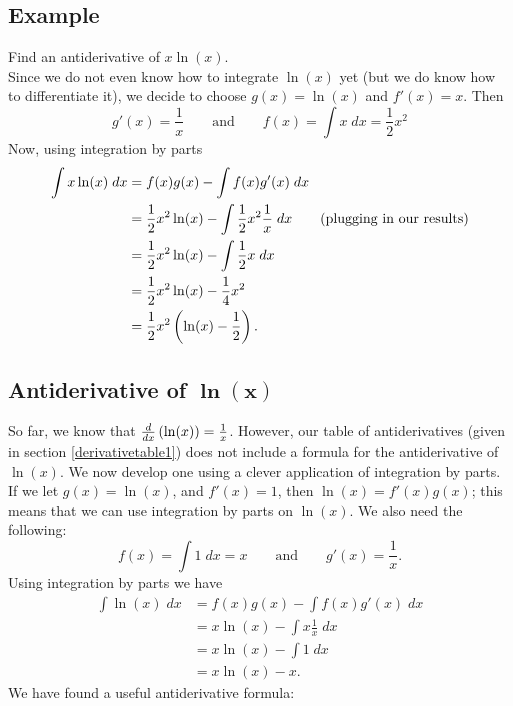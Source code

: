 \subsection{Example}
Find an antiderivative of $x\ln(x)$. \\

\solution
Since we do not even know how to integrate $\ln(x)$ yet (but we do know how to differentiate it), we decide to choose $g(x) = \ln(x)$ and $f'(x) = x$. Then
\[
g'(x) = \frac{1}{x} \qquad \text{and} \qquad f(x) = \int x \; dx = \frac{1}{2}x^2 
\]
Now, using integration by parts
\begin{align*}
\int x\ln(x) \; dx & = f(x)g(x) - \int f(x)g'(x) \; dx	\\
		& = \frac{1}{2}x^2\ln(x) - \int \frac{1}{2}x^2 \frac{1}{x} \; dx \tag{plugging in our results} \\
		& =  \frac{1}{2}x^2\ln(x) - \int \frac{1}{2}x \; dx \\
		& = \frac{1}{2}x^2\ln(x) - \frac{1}{4}x^2 \\
		& = \frac{1}{2}x^2\left(\ln(x) - \frac{1}{2}\right).
\end{align*}

\subsection{Antiderivative of $\boldsymbol{\ln(x)}$}
So far, we know that $\frac{d}{dx}\left(\ln(x)\right) = \frac{1}{x}$. However, our table of antiderivatives (given in section \ref{derivativetable1}) does not include a formula for the antiderivative of $\ln(x)$. We now develop one using a clever application of integration by parts. \\

\noindent If we let $g(x) = \ln(x)$, and $f'(x) = 1$, then $\ln(x) = f'(x)g(x)$; this means that we can use integration by parts on $\ln(x)$. We also need the following:
\[
f(x) = \int 1 \; dx = x \qquad \text{and} \qquad g'(x) = \frac{1}{x}.
\]
Using integration by parts we have
\begin{align*}
\int \ln(x) \; dx & = f(x)g(x) - \int f(x)g'(x) \; dx \\
	& = x\ln(x) - \int x\frac{1}{x} \; dx \\
	& = x\ln(x) - \int 1 \; dx \\
	& = x\ln(x) - x.
\end{align*}
We have found a useful antiderivative formula:

  	\bigskip
	
	\hfil{}
	\bigskip

